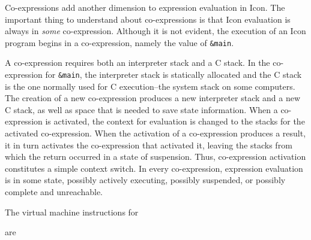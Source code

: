 Co-expressions add another dimension to expression evaluation in
Icon. The important thing to understand about co-expressions is that
Icon evaluation is always in \textit{some }co-expression. Although it
is not evident, the execution of an Icon program begins in a
co-expression, namely the value of \texttt{\&main}.

A co-expression requires both an interpreter stack and a C stack. In
the co-expression for \texttt{\&main}, the interpreter stack is
statically allocated and the C stack is the one normally used for C
execution--the {\textquotedbl}system stack{\textquotedbl} on some
computers. The creation of a new co-expression produces a new
interpreter stack and a new C stack, as well as space that is needed
to save state information. When a co-expression is activated, the
context for evaluation is changed to the stacks for the activated
co-expression. When the activation of a co-expression produces a
result, it in turn activates the co-expression that activated it,
leaving the stacks from which the return occurred in a state of
suspension. Thus, co-expression activation constitutes a simple
context switch.  In every co-expression, expression evaluation is in
some state, possibly actively executing, possibly suspended, or
possibly complete and unreachable.


The virtual machine instructions for


are

\goodbreak
{}

